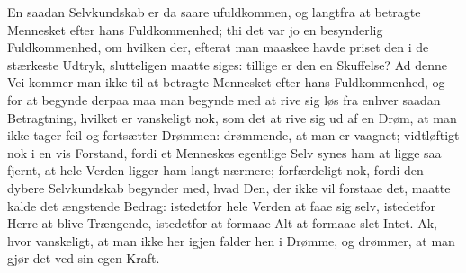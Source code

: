 \documentclass[12pt,a4paper]{article}
\begin{document}
En saadan Selvkundskab er da saare ufuldkommen, og langtfra at betragte Mennesket efter hans Fuldkommenhed; thi det var jo en besynderlig Fuldkommenhed, om hvilken der, efterat man maaskee havde priset den i de stærkeste Udtryk, slutteligen maatte siges: tillige er den en Skuffelse? Ad denne Vei kommer man ikke til at betragte Mennesket efter hans Fuldkommenhed, og for at begynde derpaa maa man begynde med at rive sig løs fra enhver saadan Betragtning, hvilket er vanskeligt nok, som det at rive sig ud af en Drøm, at man ikke tager feil og fortsætter Drømmen: drømmende, at man er vaagnet; vidtløftigt nok i en vis Forstand, fordi et Menneskes egentlige Selv synes ham at ligge saa fjernt, at hele Verden ligger ham langt nærmere; forfærdeligt nok, fordi den dybere Selvkundskab begynder med, hvad Den, der ikke vil forstaae det, maatte kalde det ængstende Bedrag: istedetfor hele Verden at faae sig selv, istedetfor Herre at blive Trængende, istedetfor at formaae Alt at formaae slet Intet. Ak, hvor vanskeligt, at man ikke her igjen falder hen i Drømme, og drømmer, at man gjør det ved sin egen Kraft.
\end{document}
